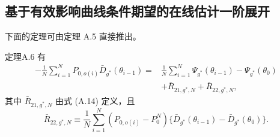 \subsection{基于有效影响曲线条件期望的在线估计一阶展开}

下面的定理可由定理 A.5 直接推出。

\begin{bookresult}{定理}{A.6}
有
\[
\begin{aligned}
-\frac1N\sum_{i=1}^NP_{0,o(i)}\bar D_{g^*}(\theta_{i-1})
={}&\frac1N\sum_{i=1}^N\Psi_{g^*}(\theta_{i-1})-\Psi_{g^*}(\theta_0)\\
&+\bar R_{21,g^*,N}+\bar R_{22,g^*,N},
\end{aligned}
\]
其中 $\bar R_{21,g^*,N}$ 由式 (A.14) 定义，且
\[
\bar R_{22,g^*,N}\equiv\frac1N\sum_{i=1}^N(P_{0,o(i)}-P_0^N)
 \{\bar D_{g^*}(\theta_{i-1})-\bar D_{g^*}(\theta_0)\}.
\]
\end{bookresult}

